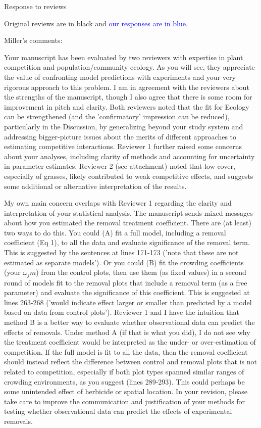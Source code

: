 \documentclass[12pt]{article}
\newcommand{\response}{\textcolor{blue}}
\begin{document}
 
\centerline{\large{Response to reviews}} 

\large{Original reviews are in black and \response{our responses are in blue.}
\normalsize 

Miller's comments: 

Your manuscript has been evaluated by two reviewers with expertise in plant competition and population/community ecology. As you will see, they appreciate the value of confronting model predictions with experiments and your very rigorous approach to this problem. I am in agreement with the reviewers about the strengths of the manuscript, though I also agree that there is some room for improvement in pitch and clarity. Both reviewers noted that the fit for Ecology can be strengthened (and the 'confirmatory' impression can be reduced), particularly in the Discussion, by generalizing beyond your study system and addressing bigger-picture issues about the merits of different approaches to estimating competitive interactions. Reviewer 1 further raised some concerns about your analyses, including clarity of methods and accounting for uncertainty in parameter estimates. Reviewer 2 (see attachment) noted that low cover, especially of grasses, likely contributed to weak competitive effects, and suggests some additional or alternative interpretation of the results. 

My own main concern overlaps with Reviewer 1 regarding the clarity and interpretation of your statistical analysis. The manuscript sends mixed messages about how you estimated the removal treatment coefficient. There are (at least) two ways to do this. You could (A) fit a full model, including a removal coefficient (Eq 1), to all the data and evaluate significance of the removal term. This is suggested by the sentences at lines 171-173 ('note that these are not estimated as separate models'). Or you could (B) fit the crowding coefficients (your $\omega_jm$) from the control plots, then use them (as fixed values) in a second round of models fit to the removal plots that include a removal term (as a free parameter) and evaluate the significance of this coefficient. This is suggested at lines 263-268 ('would indicate effect larger or smaller than predicted by a model based on data from control plots'). Reviewer 1 and I have the intuition that method B is a better way to evaluate whether observational data can predict the effects of removals. Under method A (if that is what you did), I do not see why the treatment coefficient would be interpreted as the under- or over-estimation of competition. If the full model is fit to all the data, then the removal coefficient should instead reflect the difference between control and removal plots that is not related to competition, especially if both plot types spanned similar ranges of crowding environments, as you suggest (lines 289-293). This could perhaps be some unintended effect of herbicide or spatial location. In your revision, please take care to improve the communication and justification of your methods for testing whether observational data can predict the effects of experimental removals. 

}
\end{document}
